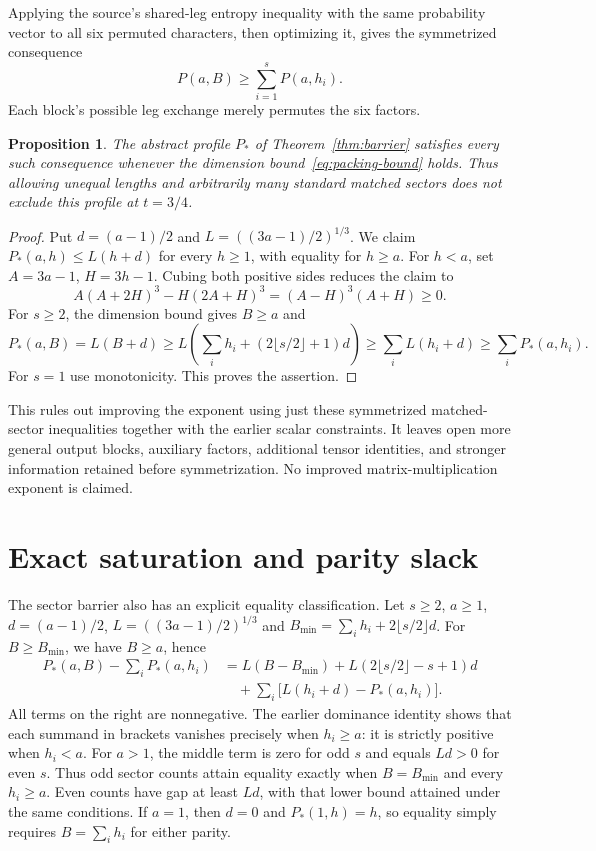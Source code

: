 \documentclass[11pt]{article}
\newtheorem{proposition}{Proposition}
\begin{document}
Applying the source's shared-leg entropy inequality with the same
probability vector to all six permuted characters, then optimizing it,
gives the symmetrized consequence
\[
 P(a,B)\ge\sum_{i=1}^sP(a,h_i).
\]
Each block's possible leg exchange merely permutes the six factors.

\begin{proposition}
The abstract profile $P_*$ of Theorem~\ref{thm:barrier} satisfies every
such consequence whenever the dimension bound~\eqref{eq:packing-bound}
holds. Thus allowing unequal lengths and arbitrarily many standard
matched sectors does not exclude this profile at $t=3/4$.
\end{proposition}
\begin{proof}
Put $d=(a-1)/2$ and $L=((3a-1)/2)^{1/3}$. We claim
$P_*(a,h)\le L(h+d)$ for every $h\ge1$, with equality for $h\ge a$.
For $h<a$, set $A=3a-1$, $H=3h-1$. Cubing both positive sides reduces
the claim to
\[
 A(A+2H)^3-H(2A+H)^3=(A-H)^3(A+H)\ge0.
\]
For $s\ge2$, the dimension bound gives $B\ge a$ and
\[
 P_*(a,B)=L(B+d)
 \ge L\left(\sum_i h_i+(2\lfloor s/2\rfloor+1)d\right)
 \ge\sum_iL(h_i+d)\ge\sum_iP_*(a,h_i).
\]
For $s=1$ use monotonicity. This proves the assertion.
\end{proof}
This rules out improving the exponent using just these symmetrized
matched-sector inequalities together with the earlier scalar constraints.
It leaves open more general output blocks, auxiliary factors, additional
tensor identities, and stronger information retained before symmetrization.
No improved matrix-multiplication exponent is claimed.


\section{Exact saturation and parity slack}
The sector barrier also has an explicit equality classification.
Let $s\ge2$, $a\ge1$, $d=(a-1)/2$, $L=((3a-1)/2)^{1/3}$ and
$B_{\min}=\sum_i h_i+2\lfloor s/2\rfloor d$. For $B\ge B_{\min}$,
we have $B\ge a$, hence
\begin{align*}
 P_*(a,B)-\sum_i P_*(a,h_i)
 &=L(B-B_{\min})
   +L(2\lfloor s/2\rfloor-s+1)d\\
 &\quad+\sum_i\bigl[L(h_i+d)-P_*(a,h_i)\bigr].
\end{align*}
All terms on the right are nonnegative. The earlier dominance identity
shows that each summand in brackets vanishes precisely when $h_i\ge a$:
it is strictly positive when $h_i<a$. For $a>1$, the middle term is zero
for odd $s$ and equals $Ld>0$ for even $s$. Thus odd sector counts attain
equality exactly when $B=B_{\min}$ and every $h_i\ge a$. Even counts
have gap at least $Ld$, with that lower bound attained under the same
conditions. If $a=1$, then $d=0$ and $P_*(1,h)=h$, so equality simply
requires $B=\sum_i h_i$ for either parity.
\end{document}
